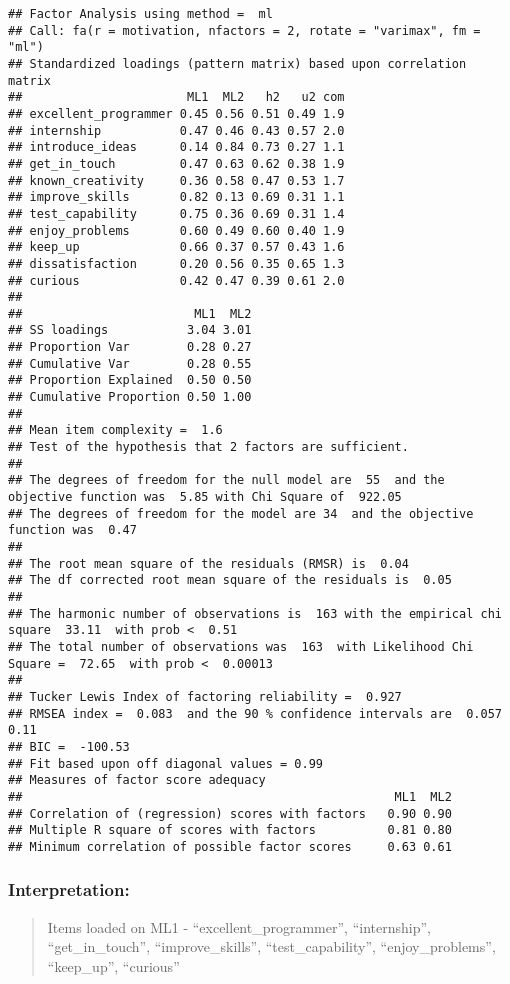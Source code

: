 \documentclass[
]{article}
\begin{document}
\begin{verbatim}
## Factor Analysis using method =  ml
## Call: fa(r = motivation, nfactors = 2, rotate = "varimax", fm = "ml")
## Standardized loadings (pattern matrix) based upon correlation matrix
##                       ML1  ML2   h2   u2 com
## excellent_programmer 0.45 0.56 0.51 0.49 1.9
## internship           0.47 0.46 0.43 0.57 2.0
## introduce_ideas      0.14 0.84 0.73 0.27 1.1
## get_in_touch         0.47 0.63 0.62 0.38 1.9
## known_creativity     0.36 0.58 0.47 0.53 1.7
## improve_skills       0.82 0.13 0.69 0.31 1.1
## test_capability      0.75 0.36 0.69 0.31 1.4
## enjoy_problems       0.60 0.49 0.60 0.40 1.9
## keep_up              0.66 0.37 0.57 0.43 1.6
## dissatisfaction      0.20 0.56 0.35 0.65 1.3
## curious              0.42 0.47 0.39 0.61 2.0
## 
##                        ML1  ML2
## SS loadings           3.04 3.01
## Proportion Var        0.28 0.27
## Cumulative Var        0.28 0.55
## Proportion Explained  0.50 0.50
## Cumulative Proportion 0.50 1.00
## 
## Mean item complexity =  1.6
## Test of the hypothesis that 2 factors are sufficient.
## 
## The degrees of freedom for the null model are  55  and the objective function was  5.85 with Chi Square of  922.05
## The degrees of freedom for the model are 34  and the objective function was  0.47 
## 
## The root mean square of the residuals (RMSR) is  0.04 
## The df corrected root mean square of the residuals is  0.05 
## 
## The harmonic number of observations is  163 with the empirical chi square  33.11  with prob <  0.51 
## The total number of observations was  163  with Likelihood Chi Square =  72.65  with prob <  0.00013 
## 
## Tucker Lewis Index of factoring reliability =  0.927
## RMSEA index =  0.083  and the 90 % confidence intervals are  0.057 0.11
## BIC =  -100.53
## Fit based upon off diagonal values = 0.99
## Measures of factor score adequacy             
##                                                    ML1  ML2
## Correlation of (regression) scores with factors   0.90 0.90
## Multiple R square of scores with factors          0.81 0.80
## Minimum correlation of possible factor scores     0.63 0.61
\end{verbatim}

\hypertarget{interpretation-12}{%
\subsubsection{Interpretation:}\label{interpretation-12}}

\begin{quote}
Items loaded on ML1 - ``excellent\_programmer'', ``internship'',
``get\_in\_touch'', ``improve\_skills'', ``test\_capability'',
``enjoy\_problems'', ``keep\_up'', ``curious''
\end{quote}
\end{document}
